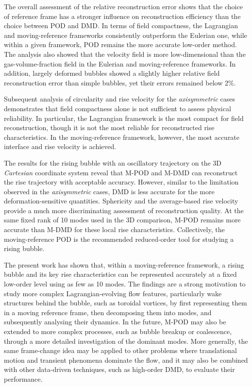 \documentclass[a4paper,fleqn]{cas-sc}
\begin{document}
	The overall assessment of the relative reconstruction error shows that the choice of reference frame has a stronger influence on reconstruction efficiency than the choice between POD and DMD. In terms of field compactness, the Lagrangian and moving-reference frameworks consistently outperform the Eulerian one, while within a given framework, POD remains the more accurate low-order method. The analysis also showed that the velocity field is more low-dimensional than the gas-volume-fraction field in the Eulerian and moving-reference frameworks. In addition, largely deformed bubbles showed a slightly higher relative field reconstruction error than simple bubbles, yet their errors remained below 2\%. 
	
	Subsequent analysis of circularity and rise velocity for the \textit{axisymmetric} cases demonstrates that field compactness alone is not sufficient to assess physical reliability. In particular, the Lagrangian framework is the most compact for field reconstruction, though it is not the most reliable for reconstructed rise characteristics. In the moving-reference framework, however, the most accurate interface and rise velocity is achieved. 
	
	The results for the rising bubble with an oscillatory trajectory on the 3D \textit{Cartesian} coordinate system reveal that M-POD and M-DMD can reconstruct the rise trajectory with acceptable accuracy. However, similar to the limitation observed in the \textit{axisymmetric} cases, DMD is less accurate for the more deformation-sensitive quantities. Sphericity and the average-based rise velocity provide a much more discriminating assessment of reconstruction quality. At the same fixed rank of 10 modes used in the 3D comparison, M-POD remains more accurate than M-DMD for these local rise characteristics. Collectively, the moving-reference POD is the recommended reduced-order tool for studying a rising bubble.
	
	The present work has shown that, within a moving-reference framework, a rising bubble and its key rise characteristics can be represented accurately at a fixed low-order level using as few as 10 modes. The findings are a strong motivation to study more complex Lagrangian-evolving flow features, particularly wake structures behind the bubble, such as toroidal vortices, by first representing them in a moving reference frame, then decomposing them into modes, and subsequently analysing their dynamics. In the future, M-POD may also be extended to more complex processes, such as bubble breakup or coalescence, through a more detailed investigation of the dominant modes. More generally, the same frame-change idea may be applied to other problems where translational motion and transient phenomena dominate the flow, and it may also be combined with other data-driven techniques, such as high-order DMD, to evaluate their performance. \\
	
\end{document}
